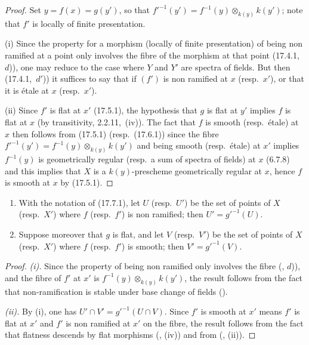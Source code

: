 \begin{proof}
Set $y=f(x)=g(y')$, so that $f'^{-1}(y')=f^{-1}(y)\otimes_{k(y)}k(y')$; note that $f'$ is locally of finite presentation.

(i) Since the property for a morphism (locally of finite presentation) of being non ramified at a point only involves the fibre of the morphism at that point (17.4.1,~$d$)), one may reduce to the case where $Y$ and $Y'$ are spectra of fields.
But then (17.4.1,~$d'$)) it suffices to say that if $(f')$ is non ramified at $x$ (resp.\ $x'$), or that it is \'etale at $x$ (resp.\ $x'$).

(ii) Since $f'$ is flat at $x'$ (17.5.1), the hypothesis that $g$ is flat at $y'$ implies $f$ is flat at $x$ (by transitivity, 2.2.11,~(iv)).
The fact that $f$ is smooth (resp.\ \'etale) at $x$ then follows from (17.5.1) (resp.\ (17.6.1)) since the fibre $f'^{-1}(y')=f^{-1}(y)\otimes_{k(y)}k(y')$ and being smooth (resp.\ \'etale) at $x'$ implies $f^{-1}(y)$ is geometrically regular (resp.\ a sum of spectra of fields) at $x$ (6.7.8) and this implies that $X$ is a $k(y)$-prescheme geometrically regular at $x$, hence $f$ is smooth at $x$ by (17.5.1).
\end{proof}

\begin{corollary}[17.7.2]
\label{IV.17.7.2}
\begin{enumerate}[label=(\roman*)]
  \item With the notation of (17.7.1), let $U$ (resp.\ $U'$) be the set of points of $X$ (resp.\ $X'$) where $f$ (resp.\ $f'$) is non ramified; then $U'=g'^{-1}(U)$.
  \item Suppose moreover that $g$ is flat, and let $V$ (resp.\ $V'$) be the set of points of $X$ (resp.\ $X'$) where $f$ (resp.\ $f'$) is smooth; then $V'=g'^{-1}(V)$.
\end{enumerate}
\end{corollary}

\begin{proof}
\emph{(i).} Since the property of being non ramified only involves the fibre (, $d$)), and the fibre of $f'$ at $x'$ is $f^{-1}(y)\otimes_{k(y)}k(y')$, the result follows from the fact that non-ramification is stable under base change of fields ().

\emph{(ii).} By (i), one has $U'\cap V'=g'^{-1}(U\cap V)$. Since $f'$ is smooth at $x'$ means $f'$ is flat at $x'$ and $f'$ is non ramified at $x'$ on the fibre, the result follows from the fact that flatness descends by flat morphisms (, (iv)) and from (, (ii)).
\end{proof}

